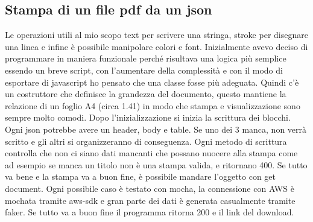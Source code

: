 \documentclass[12pt]{article}
\begin{document}
\subsection{Stampa di un file pdf da un json}
Le operazioni utili al mio scopo text per scrivere una stringa,
stroke per disegnare una linea e infine è possibile manipolare colori e font.
Inizialmente avevo deciso di programmare in maniera funzionale perché risultava
una logica più semplice essendo un breve script, con l'aumentare della complessità
e con il modo di esportare di javascript ho pensato che una classe fosse più adeguata.
Quindi c'è un costruttore che definisce la grandezza del documento, questo mantiene
la relazione di un foglio A4 (circa 1.41) in modo che stampa e visualizzazione sono
sempre molto comodi. Dopo l'inizializzazione si inizia la scrittura dei blocchi.
Ogni json potrebbe avere un header, body e table. Se uno dei 3 manca, non verrà
scritto e gli altri si organizzeranno di conseguenza. Ogni metodo di scrittura
controlla che non ci siano dati mancanti che possano nuocere alla stampa come ad
esempio se manca un titolo non è una stampa valida, e ritornano 400. Se tutto va
bene e la stampa va a buon fine, è possibile mandare l'oggetto con get document.
Ogni possibile caso è testato con mocha, la connessione con AWS è mochata tramite
aws-sdk e gran parte dei dati è generata casualmente tramite faker.
Se tutto va a buon fine il programma ritorna 200 e il link del download.
\end{document}
